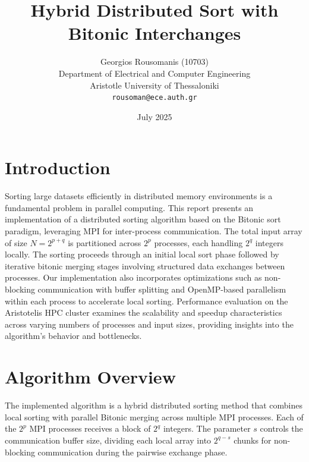 \documentclass{article}
\title{Hybrid Distributed Sort with Bitonic Interchanges}
\author{Georgios Rousomanis (10703)\\
Department of Electrical and Computer Engineering \\
Aristotle University of Thessaloniki \\
\texttt{rousoman@ece.auth.gr}}
\date{July 2025}
\begin{document}
\maketitle

\section*{Introduction}

Sorting large datasets efficiently in distributed memory environments is a fundamental problem in parallel 
computing. This report presents an implementation of a distributed sorting algorithm based on the Bitonic sort 
paradigm, leveraging MPI for inter-process communication. The total input array of size $N = 2^{p+q}$ is 
partitioned across $2^p$ processes, each handling $2^q$ integers locally. The sorting proceeds through an 
initial local sort phase followed by iterative bitonic merging stages involving structured data exchanges 
between processes. Our implementation also incorporates optimizations such as non-blocking communication 
with buffer splitting and OpenMP-based parallelism within each process to accelerate local sorting. 
Performance evaluation on the Aristotelis HPC cluster examines the scalability and speedup characteristics 
across varying numbers of processes and input sizes, providing insights into the algorithm’s behavior and 
bottlenecks.


\section{Algorithm Overview}

The implemented algorithm is a hybrid distributed sorting method that combines local sorting with 
parallel Bitonic merging across multiple MPI processes. Each of the $2^p$ MPI processes receives a 
block of $2^q$ integers. The parameter $s$ controls the communication buffer size, dividing each local 
array into $2^{q-s}$ chunks for non-blocking communication during the pairwise exchange phase.
\end{document}
